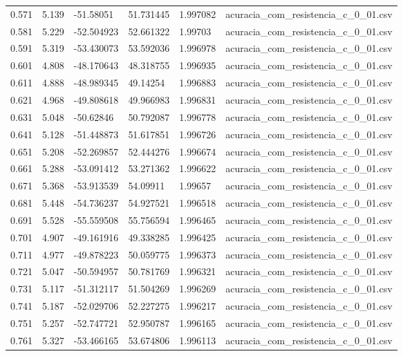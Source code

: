 \begin{table}
\begin{tabular}{llllll}
0.571 & 5.139 & -51.58051 & 51.731445 & 1.997082 & acuracia\_com\_resistencia\_c\_0\_01.csv \\
0.581 & 5.229 & -52.504923 & 52.661322 & 1.99703 & acuracia\_com\_resistencia\_c\_0\_01.csv \\
0.591 & 5.319 & -53.430073 & 53.592036 & 1.996978 & acuracia\_com\_resistencia\_c\_0\_01.csv \\
0.601 & 4.808 & -48.170643 & 48.318755 & 1.996935 & acuracia\_com\_resistencia\_c\_0\_01.csv \\
0.611 & 4.888 & -48.989345 & 49.14254 & 1.996883 & acuracia\_com\_resistencia\_c\_0\_01.csv \\
0.621 & 4.968 & -49.808618 & 49.966983 & 1.996831 & acuracia\_com\_resistencia\_c\_0\_01.csv \\
0.631 & 5.048 & -50.62846 & 50.792087 & 1.996778 & acuracia\_com\_resistencia\_c\_0\_01.csv \\
0.641 & 5.128 & -51.448873 & 51.617851 & 1.996726 & acuracia\_com\_resistencia\_c\_0\_01.csv \\
0.651 & 5.208 & -52.269857 & 52.444276 & 1.996674 & acuracia\_com\_resistencia\_c\_0\_01.csv \\
0.661 & 5.288 & -53.091412 & 53.271362 & 1.996622 & acuracia\_com\_resistencia\_c\_0\_01.csv \\
0.671 & 5.368 & -53.913539 & 54.09911 & 1.99657 & acuracia\_com\_resistencia\_c\_0\_01.csv \\
0.681 & 5.448 & -54.736237 & 54.927521 & 1.996518 & acuracia\_com\_resistencia\_c\_0\_01.csv \\
0.691 & 5.528 & -55.559508 & 55.756594 & 1.996465 & acuracia\_com\_resistencia\_c\_0\_01.csv \\
0.701 & 4.907 & -49.161916 & 49.338285 & 1.996425 & acuracia\_com\_resistencia\_c\_0\_01.csv \\
0.711 & 4.977 & -49.878223 & 50.059775 & 1.996373 & acuracia\_com\_resistencia\_c\_0\_01.csv \\
0.721 & 5.047 & -50.594957 & 50.781769 & 1.996321 & acuracia\_com\_resistencia\_c\_0\_01.csv \\
0.731 & 5.117 & -51.312117 & 51.504269 & 1.996269 & acuracia\_com\_resistencia\_c\_0\_01.csv \\
0.741 & 5.187 & -52.029706 & 52.227275 & 1.996217 & acuracia\_com\_resistencia\_c\_0\_01.csv \\
0.751 & 5.257 & -52.747721 & 52.950787 & 1.996165 & acuracia\_com\_resistencia\_c\_0\_01.csv \\
0.761 & 5.327 & -53.466165 & 53.674806 & 1.996113 & acuracia\_com\_resistencia\_c\_0\_01.csv \\

\end{tabular}
\end{table}
